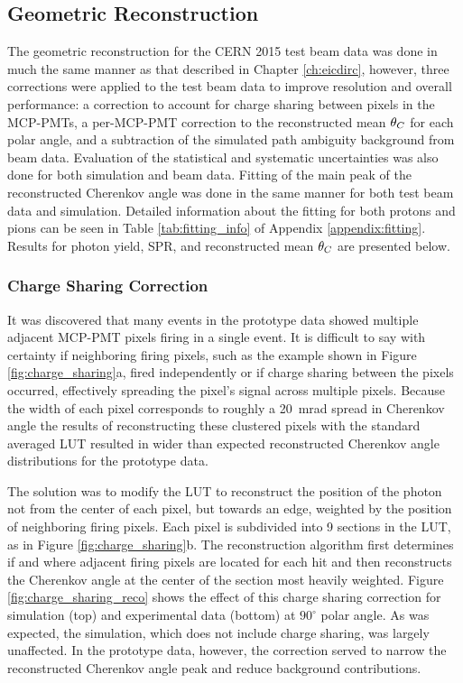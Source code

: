 \subsection{Geometric Reconstruction}
The geometric reconstruction for the CERN 2015 test beam data was done in much the same manner as that described in Chapter \ref{ch:eicdirc}, however, three corrections were applied to the test beam data to improve resolution and overall performance: a correction to account for charge sharing between pixels in the MCP-PMTs, a per-MCP-PMT correction to the reconstructed mean $\theta_{C}$ for each polar angle, and a subtraction of the simulated path ambiguity background from beam data. Evaluation of the statistical and systematic uncertainties was also done for both simulation and beam data. Fitting of the main peak of the reconstructed Cherenkov angle was done in the same manner for both test beam data and simulation. Detailed information about the fitting for both protons and pions can be seen in Table \ref{tab:fitting_info} of Appendix \ref{appendix:fitting}. Results for photon yield, SPR, and reconstructed mean $\theta_{C}$ are presented below.

\subsubsection{Charge Sharing Correction}
It was discovered that many events in the prototype data showed multiple adjacent MCP-PMT pixels firing in a single event. It is difficult to say with certainty if neighboring firing pixels, such as the example shown in Figure \ref{fig:charge_sharing}a, fired independently or if charge sharing between the pixels occurred, effectively spreading the pixel's signal across multiple pixels. Because the width of each pixel corresponds to roughly a 20~mrad spread in Cherenkov angle the results of reconstructing these clustered pixels with the standard averaged LUT resulted in wider than expected reconstructed Cherenkov angle distributions for the prototype data. 

The solution was to modify the LUT to reconstruct the position of the photon not from the center of each pixel, but towards an edge, weighted by the position of neighboring firing pixels. Each pixel is subdivided into 9 sections in the LUT, as in Figure \ref{fig:charge_sharing}b. The reconstruction algorithm first determines if and where adjacent firing pixels are located for each hit and then reconstructs the Cherenkov angle at the center of the section most heavily weighted. Figure \ref{fig:charge_sharing_reco} shows the effect of this charge sharing correction for simulation (top) and experimental data (bottom) at $90^\circ$ polar angle. As was expected, the simulation, which does not include charge sharing, was largely unaffected. In the prototype data, however, the correction served to narrow the reconstructed Cherenkov angle peak and reduce background contributions.

